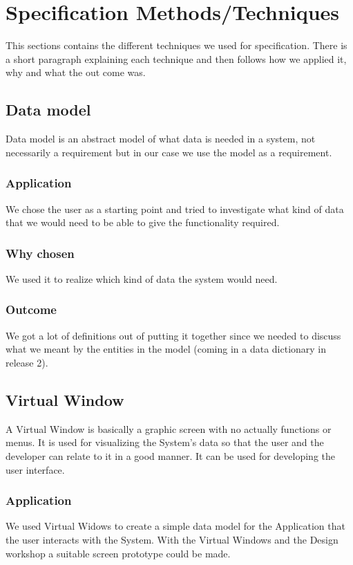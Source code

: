 \documentclass[a4paper]{article}
\begin{document}
	\section{Specification Methods/Techniques}
This sections contains the different techniques we used for specification. There is a short paragraph explaining each technique and then follows how we applied it, why and what the out come was.

		\subsection{Data model}
Data model is an abstract model of what data is needed in a system, not necessarily a requirement but in our case we use the model as a requirement.
	
		\subsubsection{Application}
		We chose the user as a starting point and tried to investigate what kind of data that we would need to be able to give the functionality required.
		\subsubsection{Why chosen}
		We used it to realize which kind of data the system would need.
		\subsubsection{Outcome}
	We got a lot of definitions out of putting it together since we needed to discuss what we meant by the entities in the model (coming in a data dictionary in release 2).

		\subsection{Virtual Window}
			A Virtual Window is basically a graphic screen with no actually functions or menus. It is used for visualizing the System's data so that the user and the developer can relate to it in a good manner. It can be used for developing the user interface.
			\subsubsection{Application}
				We used Virtual Widows to create a simple data model for the Application that the user interacts with the System. With the Virtual Windows and the Design workshop a suitable screen prototype could be made.
\end{document}
